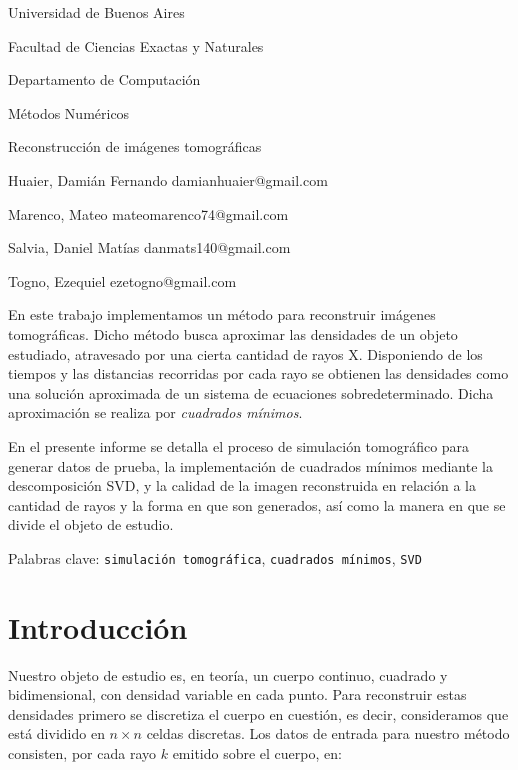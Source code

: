 \documentclass[a4paper]{article}
\begin{document}
\thispagestyle{plain}
\DontPrintSemicolon

\centerline{\Large Universidad de Buenos Aires}
\vspace{2.5mm}
\centerline{\Large Facultad de Ciencias Exactas y Naturales}
\vspace{2.5mm}
\centerline{\Large Departamento de Computaci\'on}
\vspace{2.5mm}
\centerline{\Large Métodos Num\'ericos}
\vspace{12.5mm}
\centerline{\huge Reconstrucción de imágenes tomográficas}\par
\vspace{10mm}
\centerline{Huaier, Damián Fernando damianhuaier@gmail.com}
\centerline{Marenco, Mateo mateomarenco74@gmail.com}
\centerline{Salvia, Daniel Matías danmats140@gmail.com}
\centerline{Togno, Ezequiel ezetogno@gmail.com}
\vspace{10mm}

En este trabajo implementamos un método para reconstruir imágenes tomográficas. Dicho método busca aproximar las densidades de un objeto estudiado, 
atravesado por una cierta cantidad de rayos X. Disponiendo de los tiempos y las distancias recorridas por cada rayo se obtienen 
las densidades como una solución aproximada de un sistema de ecuaciones sobredeterminado. Dicha aproximación se realiza por \textit{cuadrados mínimos}.

En el presente informe se detalla el proceso de simulación tomográfico para generar datos de prueba, la implementación de cuadrados mínimos mediante 
la descomposición SVD, y la calidad de la imagen reconstruida en relación a la cantidad de rayos y la forma en que son generados, así como la manera 
en que se divide el objeto de estudio.

\vspace{0.5cm}

\noindent Palabras clave: \texttt{simulación tomográfica}, \texttt{cuadrados mínimos}, \texttt{SVD}

\newpage

\tableofcontents

\newpage

\setlength{\parskip}{0.2cm}

\newpage

\section{Introducción}

Nuestro objeto de estudio es, en teoría, un cuerpo continuo, cuadrado y bidimensional, con densidad variable en cada punto. Para reconstruir estas 
densidades primero se discretiza el cuerpo en cuestión, es decir, consideramos que está dividido en $n \times n$ celdas discretas. Los datos de 
entrada para nuestro método consisten, por cada rayo $k$ emitido sobre el cuerpo, en:
\end{document}
